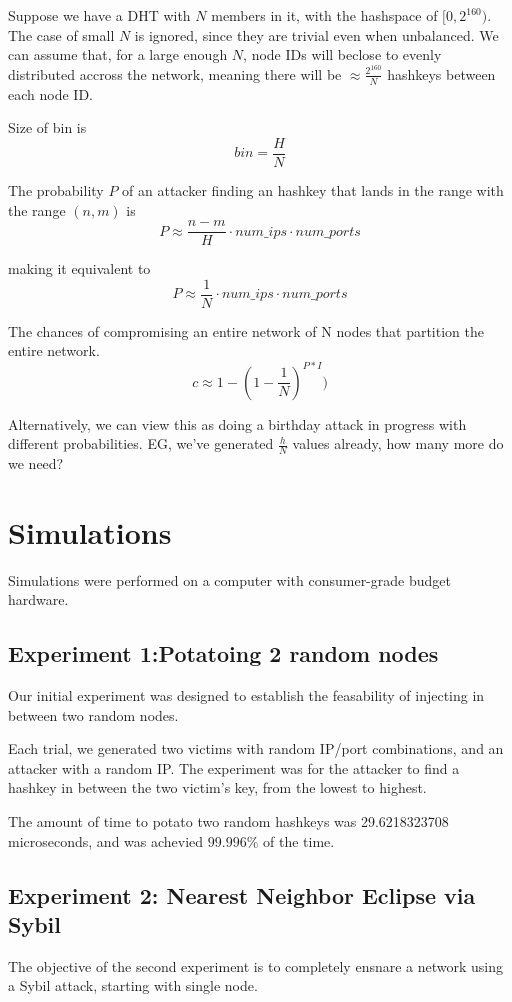 \documentclass[10pt,a4paper]{article}
\begin{document}
Suppose we have a DHT with $N$ members in it, with the hashspace of $[0,2^{160})$.
The case of small $N$ is ignored, since they are trivial even when unbalanced.
We can assume that, for a large enough $N$, node IDs will beclose to evenly distributed accross the network, meaning there will be $\approx \frac{2^{160}}{N}$ hashkeys between each node ID.


Size of bin is $$ bin =  \frac{H}{N} $$

The probability $P$ of an attacker finding an hashkey that lands in the range with the range $(n,m)$ is 
$$ P \approx \frac{n-m}{H}\cdot num\_ips \cdot num\_ports  $$

making it equivalent to
$$ P \approx \frac{1}{N}\cdot num\_ips \cdot num\_ports  $$


The chances of compromising an entire network of N nodes that partition the entire network.
$$c \approx  1 - (1 -\frac{1}{N})^{P*I})  $$

Alternatively, we can view this as doing a birthday attack in progress with different probabilities.
EG, we've generated $\frac{h}{N}$ values already, how many more do we need?


\section{Simulations}
Simulations were performed on a computer with consumer-grade budget hardware. 


\subsection{Experiment 1:Potatoing 2 random nodes}
Our initial experiment was designed to establish the feasability of injecting in between two random nodes.

Each trial, we generated two victims with random IP/port combinations, and an attacker with a random IP.
The experiment was for the attacker to find a hashkey in between the two victim's key, from the lowest to highest.

The amount of time to potato two random hashkeys was 29.6218323708 microseconds, and was achevied $ 99.996\%$ of the time.



\subsection{Experiment 2:  Nearest Neighbor Eclipse via Sybil}
The objective of the second experiment is to completely ensnare a network using a Sybil attack, starting with single node.
\end{document}
